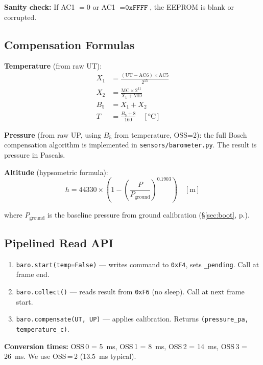 \documentclass[11pt, a4paper, twoside]{article}
\newcommand{\reg}[1]{\texttt{0x#1}}
\newcommand{\file}[1]{\texttt{#1}}
\newcommand{\xref}[1]{(\S\ref{#1}, p.\pageref{#1})}
\begin{document}
\textbf{Sanity check:} If AC1 $= 0$ or AC1 $= \texttt{0xFFFF}$, the EEPROM is blank or corrupted.

\subsection{Compensation Formulas}

\textbf{Temperature} (from raw UT):
\begin{align}
X_1 &= \frac{(\text{UT} - \text{AC6}) \times \text{AC5}}{2^{15}} \\
X_2 &= \frac{\text{MC} \times 2^{11}}{X_1 + \text{MD}} \\
B_5 &= X_1 + X_2 \\
T &= \frac{B_5 + 8}{160} \quad [\si{\degreeCelsius}]
\end{align}

\textbf{Pressure} (from raw UP, using $B_5$ from temperature, OSS=2): the full Bosch compensation algorithm is implemented in \file{sensors/barometer.py}. The result is pressure in Pascals.

\textbf{Altitude} (hypsometric formula):
\begin{equation}
h = 44330 \times \left(1 - \left(\frac{P}{P_\text{ground}}\right)^{0.1903}\right) \quad [\si{\metre}]
\label{eq:altitude}
\end{equation}

where $P_\text{ground}$ is the baseline pressure from ground calibration \xref{sec:boot}.

\subsection{Pipelined Read API}

\begin{enumerate}
    \item \texttt{baro.start(temp=False)} --- writes command to \reg{F4}, sets \texttt{\_pending}. Call at frame end.
    \item \texttt{baro.collect()} --- reads result from \reg{F6} (no sleep). Call at next frame start.
    \item \texttt{baro.compensate(UT, UP)} --- applies calibration. Returns \texttt{(pressure\_pa, temperature\_c)}.
\end{enumerate}

\textbf{Conversion times:} OSS\,0 = \SI{5}{\milli\second}, OSS\,1 = \SI{8}{\milli\second}, OSS\,2 = \SI{14}{\milli\second}, OSS\,3 = \SI{26}{\milli\second}. We use OSS\,=\,2 (\SI{13.5}{\milli\second} typical).
\end{document}
